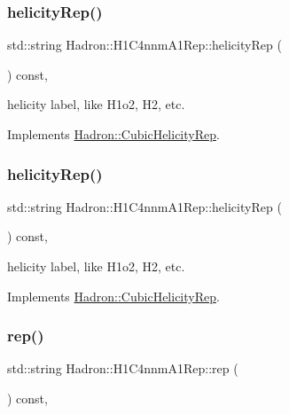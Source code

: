 \subsubsection{\texorpdfstring{helicityRep()}{helicityRep()}\hspace{0.1cm}{\footnotesize\ttfamily [2/3]}}
{\footnotesize\ttfamily std\+::string Hadron\+::\+H1\+C4nnm\+A1\+Rep\+::helicity\+Rep (\begin{DoxyParamCaption}{ }\end{DoxyParamCaption}) const\hspace{0.3cm}{\ttfamily [inline]}, {\ttfamily [virtual]}}

helicity label, like H1o2, H2, etc. 

Implements \mbox{\hyperlink{structHadron_1_1CubicHelicityRep_af1096946b7470edf0a55451cc662f231}{Hadron\+::\+Cubic\+Helicity\+Rep}}.

\mbox{\label{structHadron_1_1H1C4nnmA1Rep_a1ef14b37ee0380d3c1dbc261b412772d}} 
\subsubsection{\texorpdfstring{helicityRep()}{helicityRep()}\hspace{0.1cm}{\footnotesize\ttfamily [3/3]}}
{\footnotesize\ttfamily std\+::string Hadron\+::\+H1\+C4nnm\+A1\+Rep\+::helicity\+Rep (\begin{DoxyParamCaption}{ }\end{DoxyParamCaption}) const\hspace{0.3cm}{\ttfamily [inline]}, {\ttfamily [virtual]}}

helicity label, like H1o2, H2, etc. 

Implements \mbox{\hyperlink{structHadron_1_1CubicHelicityRep_af1096946b7470edf0a55451cc662f231}{Hadron\+::\+Cubic\+Helicity\+Rep}}.

\mbox{\label{structHadron_1_1H1C4nnmA1Rep_a66b6495d208ea091b2e8b5e45bf67c29}} 
\subsubsection{\texorpdfstring{rep()}{rep()}\hspace{0.1cm}{\footnotesize\ttfamily [1/5]}}
{\footnotesize\ttfamily std\+::string Hadron\+::\+H1\+C4nnm\+A1\+Rep\+::rep (\begin{DoxyParamCaption}{ }\end{DoxyParamCaption}) const\hspace{0.3cm}{\ttfamily [inline]}, {\ttfamily [virtual]}}



